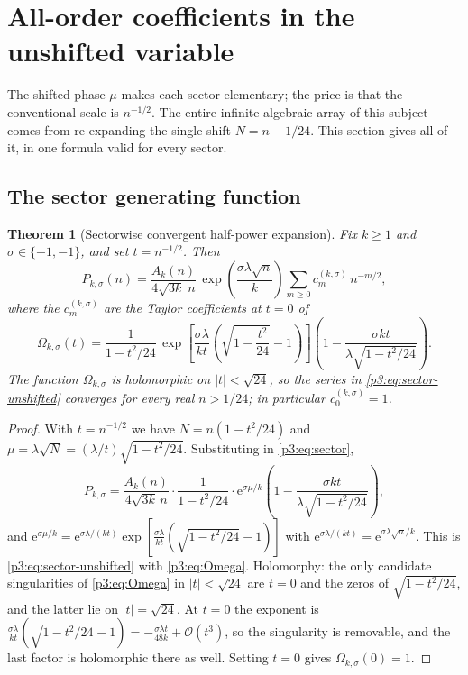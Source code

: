\documentclass[11pt,a4paper,oneside]{book}
\theoremstyle{plain}
\newtheorem{theorem}{Theorem}[chapter]
\theoremstyle{definition}
\theoremstyle{remark}
\newcommand{\e}{\mathrm{e}}
\newcommand{\bigO}{\mathcal{O}}
\begin{document}
\section{All-order coefficients in the unshifted variable}\label{p3:sec:half-powers}

The shifted phase $\mu$ makes each sector elementary; the price is that the conventional scale is
$n^{-1/2}$. The entire infinite algebraic array of this subject comes from re-expanding the single
shift $N=n-1/24$. This section gives all of it, in one formula valid for every sector.

\subsection{The sector generating function}

\begin{theorem}[Sectorwise convergent half-power expansion]
\label{p3:thm:sector-gf}
Fix $k\ge1$ and $\sigma\in\{+1,-1\}$, and set $t=n^{-1/2}$. Then
\begin{equation}\label{p3:eq:sector-unshifted}
 P_{k,\sigma}(n)=\frac{A_{k}(n)}{4\sqrt{3k}\;n}\,
 \exp\!\left(\frac{\sigma\lambda\sqrt n}{k}\right)
 \sum_{m\ge0}c^{(k,\sigma)}_{m}\,n^{-m/2},
\end{equation}
where the $c^{(k,\sigma)}_{m}$ are the Taylor coefficients at $t=0$ of
\begin{equation}\label{p3:eq:Omega}
 \Omega_{k,\sigma}(t)
 =\frac1{1-t^{2}/24}\,
 \exp\!\left[\frac{\sigma\lambda}{kt}
 \left(\sqrt{1-\frac{t^{2}}{24}}-1\right)\right]
 \left(1-\frac{\sigma kt}{\lambda\sqrt{1-t^{2}/24}}\right).
\end{equation}
The function $\Omega_{k,\sigma}$ is holomorphic on $|t|<\sqrt{24}$, so the series in
\cref{p3:eq:sector-unshifted} converges for every real $n>1/24$; in particular
$c^{(k,\sigma)}_{0}=1$.
\end{theorem}

\begin{proof}
With $t=n^{-1/2}$ we have $N=n(1-t^{2}/24)$ and $\mu=\lambda\sqrt N=(\lambda/t)\sqrt{1-t^{2}/24}$.
Substituting in \cref{p3:eq:sector},
\[
P_{k,\sigma} =\frac{A_{k}(n)}{4\sqrt{3k}\,n}\cdot\frac1{1-t^{2}/24}\cdot
\e^{\sigma\mu/k}\left(1-\frac{\sigma kt}{\lambda\sqrt{1-t^{2}/24}}\right),
\]
and $\e^{\sigma\mu/k}=\e^{\sigma\lambda/(kt)}
\exp[\tfrac{\sigma\lambda}{kt}(\sqrt{1-t^{2}/24}-1)]$ with
$\e^{\sigma\lambda/(kt)}=\e^{\sigma\lambda\sqrt n/k}$. This is \cref{p3:eq:sector-unshifted} with
\cref{p3:eq:Omega}. Holomorphy: the only candidate singularities of \cref{p3:eq:Omega} in
$|t|<\sqrt{24}$ are $t=0$ and the zeros of $\sqrt{1-t^{2}/24}$, and the latter lie on
$|t|=\sqrt{24}$. At $t=0$ the exponent is
$\frac{\sigma\lambda}{kt}(\sqrt{1-t^{2}/24}-1)=-\frac{\sigma\lambda t}{48k} +\bigO(t^{3})$,
so the singularity is removable, and the last factor is holomorphic there as well. Setting $t=0$
gives $\Omega_{k,\sigma}(0)=1$.
\end{proof}
\end{document}
